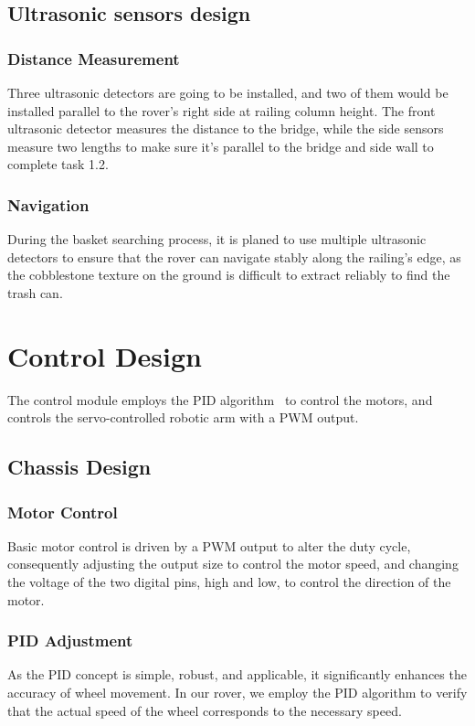 \documentclass{article}
\begin{document}
    \subsection{Ultrasonic sensors design}
        \subsubsection{Distance Measurement}
        Three ultrasonic detectors are going to be installed, and two of them would be installed parallel to the rover’s right side at railing column height. The front ultrasonic detector measures the distance to the bridge, while the side sensors measure two lengths to make sure it's parallel to the bridge and side wall to complete task 1.2.
        
        \subsubsection{Navigation}
        During the basket searching process, it is planed to use multiple ultrasonic detectors to ensure that the rover can navigate stably along the railing's edge, as the cobblestone texture on the ground is difficult to extract reliably to find the trash can.
        
\section{Control Design}
The control module employs the PID algorithm~\cite{pid} to control the motors, and controls the servo-controlled robotic arm with a PWM output.

    \subsection{Chassis Design}
    
        \subsubsection{Motor Control}
        Basic motor control is driven by a PWM output to alter the duty cycle, consequently adjusting the output size to control the motor speed, and changing the voltage of the two digital pins, high and low, to control the direction of the motor.
        
        \subsubsection{PID Adjustment}
        As the PID concept is simple, robust, and applicable, it significantly enhances the accuracy of wheel movement. In our rover, we employ the PID algorithm to verify that the actual speed of the wheel corresponds to the necessary speed.
        
\end{document}
